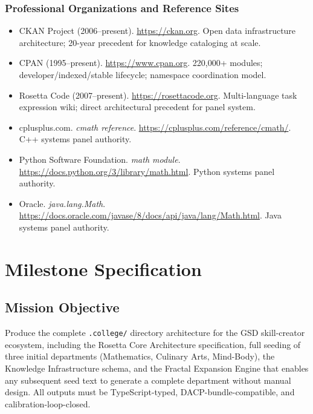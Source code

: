 \documentclass[11pt,letterpaper]{article}
\newcommand{\stageheader}[2]{%
  \noindent\colorbox{#2}{\makebox[\textwidth][l]{%
    \textcolor{white}{\bfseries\sffamily\hspace{6pt}#1\hspace{6pt}}}}%
  \vspace{0.5em}\par%
}
\begin{document}
\subsubsection{Professional Organizations and Reference Sites}
\begin{itemize}[leftmargin=1.5em]
  \item CKAN Project (2006--present). \url{https://ckan.org}. Open data infrastructure architecture; 20-year precedent for knowledge cataloging at scale.
  \item CPAN (1995--present). \url{https://www.cpan.org}. 220,000+ modules; developer/indexed/stable lifecycle; namespace coordination model.
  \item Rosetta Code (2007--present). \url{https://rosettacode.org}. Multi-language task expression wiki; direct architectural precedent for panel system.
  \item cplusplus.com. \textit{cmath reference}. \url{https://cplusplus.com/reference/cmath/}. C++ systems panel authority.
  \item Python Software Foundation. \textit{math module}. \url{https://docs.python.org/3/library/math.html}. Python systems panel authority.
  \item Oracle. \textit{java.lang.Math}. \url{https://docs.oracle.com/javase/8/docs/api/java/lang/Math.html}. Java systems panel authority.
\end{itemize}

\newpage
\stageheader{STAGE 3 --- MISSION PACKAGE}{tertiary}

\section{Milestone Specification}

\subsection{Mission Objective}

Produce the complete \texttt{.college/} directory architecture for the GSD skill-creator ecosystem, including the Rosetta Core Architecture specification, full seeding of three initial departments (Mathematics, Culinary Arts, Mind-Body), the Knowledge Infrastructure schema, and the Fractal Expansion Engine that enables any subsequent seed text to generate a complete department without manual design. All outputs must be TypeScript-typed, DACP-bundle-compatible, and calibration-loop-closed.
\end{document}
